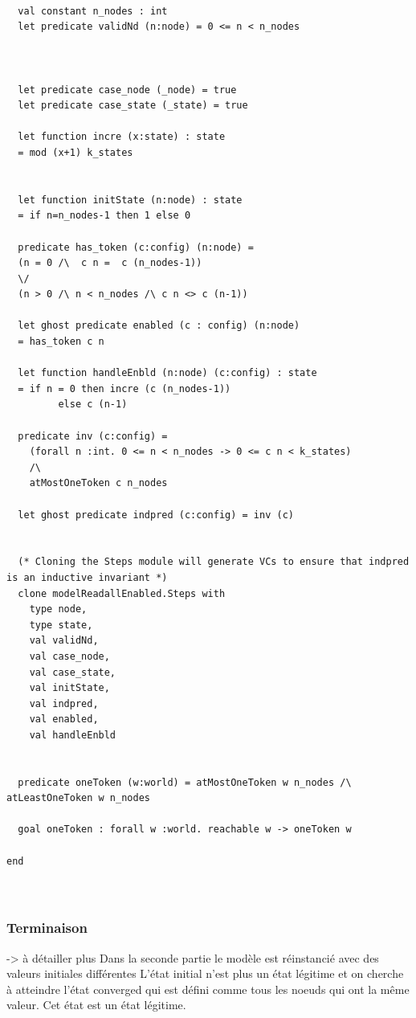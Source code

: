 \documentclass[11pt]{article}
\begin{document}
\lstset{language=why3,label= ,caption= ,captionpos=b,numbers=none}
\begin{lstlisting}

  val constant n_nodes : int
  let predicate validNd (n:node) = 0 <= n < n_nodes



  let predicate case_node (_node) = true
  let predicate case_state (_state) = true

  let function incre (x:state) : state
  = mod (x+1) k_states


  let function initState (n:node) : state
  = if n=n_nodes-1 then 1 else 0

  predicate has_token (c:config) (n:node) =
  (n = 0 /\  c n =  c (n_nodes-1))
  \/
  (n > 0 /\ n < n_nodes /\ c n <> c (n-1))

  let ghost predicate enabled (c : config) (n:node)
  = has_token c n

  let function handleEnbld (n:node) (c:config) : state
  = if n = 0 then incre (c (n_nodes-1))
	     else c (n-1)

  predicate inv (c:config) =
    (forall n :int. 0 <= n < n_nodes -> 0 <= c n < k_states)
    /\
    atMostOneToken c n_nodes

  let ghost predicate indpred (c:config) = inv (c)


  (* Cloning the Steps module will generate VCs to ensure that indpred is an inductive invariant *)
  clone modelReadallEnabled.Steps with
    type node,
    type state,
    val validNd,
    val case_node,
    val case_state,
    val initState,
    val indpred,
    val enabled,
    val handleEnbld


  predicate oneToken (w:world) = atMostOneToken w n_nodes /\ atLeastOneToken w n_nodes

  goal oneToken : forall w :world. reachable w -> oneToken w

end



\end{lstlisting}
\subsubsection{Terminaison}
\label{sec:orgf604865}

-> à détailler plus
Dans la seconde partie le modèle est réinstancié avec des valeurs initiales différentes 
L'état initial n'est plus un état légitime et on cherche à atteindre l'état converged qui 
est défini comme tous les noeuds qui ont la même valeur. Cet état est un état légitime. 
\end{document}
